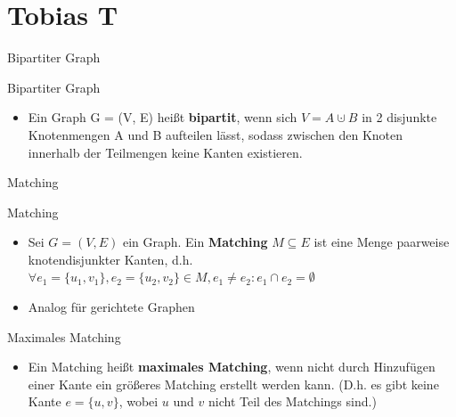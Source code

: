 \documentclass[18pt]{beamer}
\begin{document}
\section{Tobias T}
\begin{frame}{Bipartiter Graph}
\begin{block}{Bipartiter Graph}
\begin{itemize}
\item Ein Graph G = (V, E) hei{\ss}t \textbf{bipartit}, wenn sich $V = A \cupdot B$ in 2 disjunkte Knotenmengen A und B aufteilen l\"asst,
sodass zwischen den Knoten innerhalb der Teilmengen keine Kanten existieren.
\end{itemize}
\end{block}

\begin{center}
\end{center}
\end{frame}

\begin{frame}{Matching}
\begin{block}{Matching}
\begin{itemize}
\item Sei $G = (V, E)$ ein Graph. Ein \textbf{Matching} $M \subseteq E$ ist eine Menge paarweise knotendisjunkter Kanten,
d.h. $\forall e_{1} = \{u_{1}, v_{1}\}, e_{2} = \{u_{2}, v_{2}\} \in M, e_{1} \neq e_{2}: e_{1} \cap e_{2} = \emptyset$
\item Analog f\"ur gerichtete Graphen
\end{itemize}
\end{block}

\pause

\begin{block}{Maximales Matching}
\begin{itemize}
\item Ein Matching hei{\ss}t \textbf{maximales Matching}, wenn nicht durch Hinzuf\"ugen einer Kante ein gr\"o{\ss}eres Matching erstellt werden kann.
(D.h. es gibt keine Kante $e = \{u, v\}$, wobei $u$ und $v$ nicht Teil des Matchings sind.)
\end{itemize}
\end{block}
\end{frame}
\end{document}
